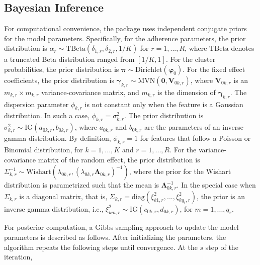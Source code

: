 

\subsection{Bayesian Inference}

For computational convenience, the  package uses independent conjugate priors for the model parameters. Specifically, for the adherence parameters, the prior distribution is $\alpha_r \sim \text{TBeta}(\delta_{1,r}, \delta_{2,r}, 1/K)$ for $r = 1,...,R$, where $\text{TBeta}$ denotes a truncated Beta distribution ranged from $[1/K, 1]$. For the cluster probabilities, the prior distribution is $\boldsymbol{\pi}\sim \text{Dirichlet}(\boldsymbol{\varphi}_0)$. For the fixed effect coefficients, the prior distribution is $\boldsymbol{\gamma}_{k,r} \sim \text{MVN}(\boldsymbol{0},\boldsymbol{V}_{0k,r})$, where $\boldsymbol{V}_{0k,r}$ is an $m_{k,r} \times m_{k,r}$ variance-covariance matrix, and $m_{k,r}$ is the dimension of $\boldsymbol{\gamma}_{k,r}$. The dispersion parameter $\phi_{k,r}$ is not constant only when the feature is a Gaussian distribution. In such a case, $\phi_{k,r} = \sigma^2_{k,r}$. The prior distribution is $\sigma^2_{k,r} \sim \text{IG}(a_{0k,r},b_{0k,r}) $, where $a_{0k,r}$ and $b_{0k,r}$ are the parameters of an inverse gamma distribution. By definition, $\phi_{k,r} = 1$ for features that follow a Poisson or Binomial distribution, for $k=1,...,K$ and $r=1,...,R$. For the variance-covariance matrix of the random effect, the prior distribution is $\Sigma_{k,r}^{-1} \sim \text{Wishart}(\lambda_{0k,r}, (\lambda_{0k,r}\boldsymbol{\Lambda}_{0k,r})^{-1} )$, where the prior for the Wishart distribution is parametrized such that the mean is $\boldsymbol{\Lambda}_{0k,r}^{-1}$. In the special case when $\Sigma_{k,r}$ is a diagonal matrix, that is, $\Sigma_{k,r} = \text{diag}(\xi^2_{k1,r},...,\xi^2_{kq_r,r})$, the prior is an inverse gamma distribution, i.e., $\xi^2_{km,r} \sim \text{IG}(c_{0k,r},d_{0k,r})$, for $m = 1,..., q_r$. 

For posterior computation, a Gibbs sampling approach to update the model parameters is described as follows. After initializing the parameters, the algorithm repeats the following steps until convergence. At the $s$ step of the iteration, 


